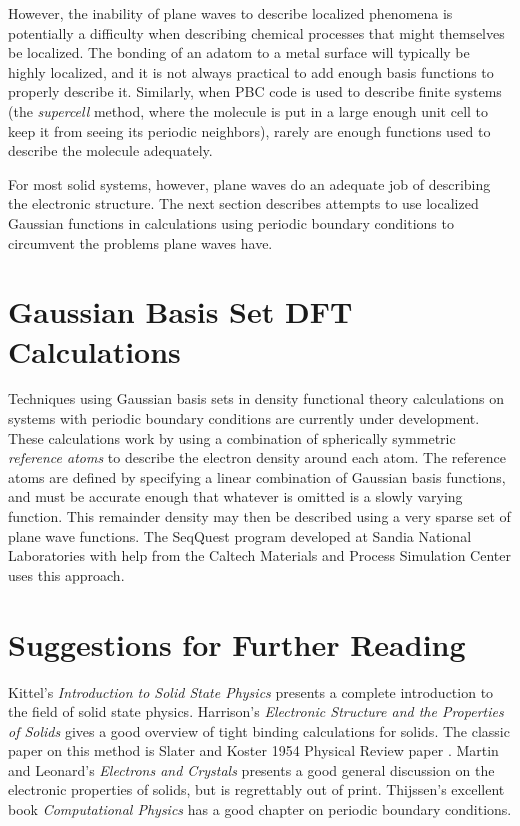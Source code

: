 However, the inability of plane waves to describe localized phenomena
is potentially a difficulty when describing chemical processes that
might themselves be localized. The bonding of an adatom to a metal
surface will typically be highly localized, and it is not always
practical to add enough basis functions to properly describe
it. Similarly, when PBC code is used to describe finite systems (the
\emph{supercell} method, where the molecule is put in a large enough
unit cell to keep it from seeing its periodic neighbors), rarely are
enough functions used to describe the molecule adequately.

For most solid systems, however, plane waves do an adequate job of
describing the electronic structure.
The next section describes attempts to use localized Gaussian functions in
calculations using periodic boundary conditions to circumvent the
problems plane waves have.

\section{Gaussian Basis Set DFT Calculations}
Techniques using Gaussian basis sets in density functional theory
calculations on systems with periodic boundary conditions are
currently under development. These calculations work by using a
combination of spherically symmetric \emph{reference atoms} to
describe the electron density around each atom. The reference atoms
are defined by specifying a linear combination of Gaussian basis
functions, and must be accurate enough that whatever is omitted is a
slowly varying function. This remainder density may then be described
using a very sparse set of plane wave functions. The SeqQuest program
developed at Sandia National Laboratories with help from the Caltech
Materials and Process Simulation Center uses this approach.


\section{Suggestions for Further Reading}
Kittel's \emph{Introduction to Solid State Physics} \cite{Kittel53}
presents a complete introduction to the field of solid state
physics. Harrison's \emph{Electronic Structure and the Properties of
Solids} \cite{Harrison80} gives a good overview of tight binding
calculations for solids. The classic paper on this method is Slater
and Koster 1954 Physical Review paper \cite{Slater54}. Martin and
Leonard's \emph{Electrons and Crystals} \cite{Martin70} presents a
good general discussion on the electronic properties of solids, but is
regrettably out of print. Thijssen's excellent book
\emph{Computational Physics} \cite{Thijssen99} has a good chapter on
periodic boundary conditions.
